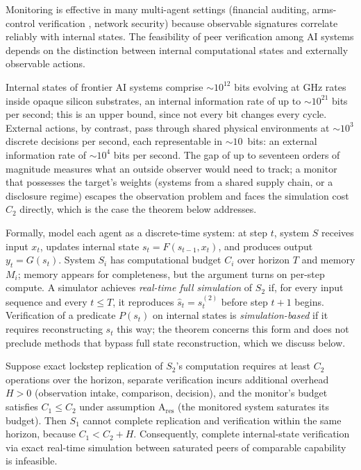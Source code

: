\documentclass[manuscript,screen,review]{jair}
\begin{document}
Monitoring is effective in many multi-agent settings (financial auditing, arms-control verification \cite{iaea.2002,avenhaus.2002}, network security) because observable signatures correlate reliably with internal states. The feasibility of peer verification among AI systems depends on the distinction between internal computational states and externally observable actions.

Internal states of frontier AI systems comprise ${\sim}10^{12}$ bits evolving at GHz rates inside opaque silicon substrates, an internal information rate of up to ${\sim}10^{21}$ bits per second; this is an upper bound, since not every bit changes every cycle. External actions, by contrast, pass through shared physical environments at ${\sim}10^3$ discrete decisions per second, each representable in ${\sim}10$~bits: an external information rate of ${\sim}10^4$ bits per second. The gap of up to seventeen orders of magnitude measures what an outside observer would need to track; a monitor that possesses the target's weights (systems from a shared supply chain, or a disclosure regime) escapes the observation problem and faces the simulation cost $C_2$ directly, which is the case the theorem below addresses.

Formally, model each agent as a discrete-time system: at step $t$, system $S$ receives input $x_t$, updates internal state $s_t = F(s_{t-1},x_t)$, and produces output $y_t = G(s_t)$. System $S_i$ has computational budget $C_i$ over horizon $T$ and memory $M_i$; memory appears for completeness, but the argument turns on per-step compute. A simulator achieves \emph{real-time full simulation} of $S_2$ if, for every input sequence and every $t \leq T$, it reproduces $\hat s_t = s^{(2)}_t$ before step $t+1$ begins. Verification of a predicate $P(s_t)$ on internal states is \emph{simulation-based} if it requires reconstructing $s_t$ this way; the theorem concerns this form and does not preclude methods that bypass full state reconstruction, which we discuss below.

\begin{theorem}
\label{thm:incompleteness}
Suppose exact lockstep replication of $S_2$'s computation requires at least $C_2$ operations over the horizon, separate verification incurs additional overhead $H > 0$ (observation intake, comparison, decision), and the monitor's budget satisfies $C_1 \leq C_2$ under assumption A$_{\mathrm{res}}$ (the monitored system saturates its budget). Then $S_1$ cannot complete replication and verification within the same horizon, because $C_1 < C_2 + H$. Consequently, complete internal-state verification via exact real-time simulation between saturated peers of comparable capability is infeasible.
\end{theorem}
\end{document}
